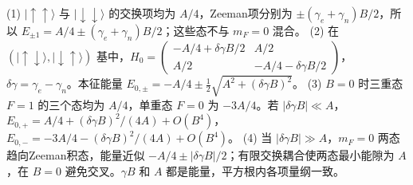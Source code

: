 (1) \(|\uparrow\uparrow\rangle\) 与 \(|\downarrow\downarrow\rangle\) 的交换项均为 \(A/4\)，Zeeman项分别为 \(\pm(\gamma_e+\gamma_n)B/2\)，所以 \(E_{\pm1}=A/4\pm(\gamma_e+\gamma_n)B/2\)；这些态不与 \(m_F=0\) 混合。
(2) 在 \((|\uparrow\downarrow\rangle,|\downarrow\uparrow\rangle)\) 基中，\(H_0=\begin{pmatrix}-A/4+\delta\gamma B/2&A/2\\A/2&-A/4-\delta\gamma B/2\end{pmatrix}\)，\(\delta\gamma=\gamma_e-\gamma_n\)。本征能量 \(E_{0,\pm}=-A/4\pm\frac12\sqrt{A^2+(\delta\gamma B)^2}\)。
(3) \(B=0\) 时三重态 \(F=1\) 的三个态均为 \(A/4\)，单重态 \(F=0\) 为 \(-3A/4\)。若 \(|\delta\gamma B|\ll A\)，\(E_{0,+}=A/4+(\delta\gamma B)^2/(4A)+O(B^4)\)，\(E_{0,-}=-3A/4-(\delta\gamma B)^2/(4A)+O(B^4)\)。
(4) 当 \(|\delta\gamma B|\gg A\)，\(m_F=0\) 两态趋向Zeeman积态，能量近似 \(-A/4\pm|\delta\gamma B|/2\)；有限交换耦合使两态最小能隙为 \(A\)，在 \(B=0\) 避免交叉。\(\gamma B\) 和 \(A\) 都是能量，平方根内各项量纲一致。
